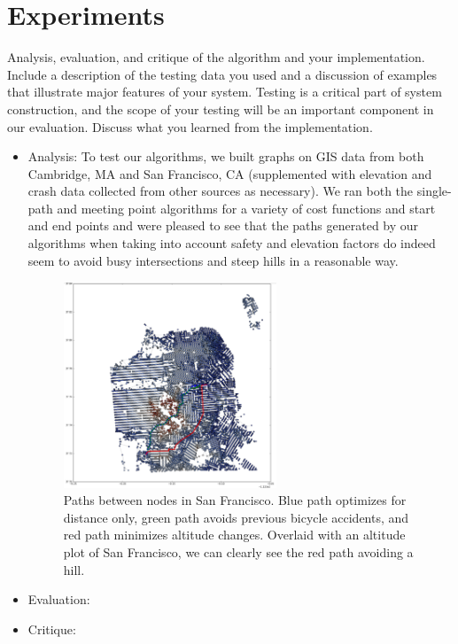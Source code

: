\documentclass[11pt]{article}
\begin{document}
\section{Experiments}
Analysis, evaluation, and critique of the algorithm and your
implementation. Include a description of the testing data you used and
a discussion of examples that illustrate major features of your
system. Testing is a critical part of system construction, and the
scope of your testing will be an important component in our
evaluation. Discuss what you learned from the implementation.
\begin{itemize}

\item{Analysis:} To test our algorithms, we built graphs on GIS data from both Cambridge, MA and San Francisco, CA (supplemented with elevation and crash data collected from other sources as necessary). We ran both the single-path and meeting point algorithms for a variety of cost functions and start and end points and were pleased to see that the paths generated by our algorithms when taking into account safety and elevation factors do indeed seem to avoid busy intersections and steep hills in a reasonable way.

\begin{figure}[H]
\caption{Paths between nodes in San Francisco. Blue path optimizes for distance only, green path avoids previous bicycle accidents, and red path minimizes altitude changes. Overlaid with an altitude plot of San Francisco, we can clearly see the red path avoiding a hill.}
\includegraphics[width=0.6\textwidth]{sf_new_plot_2.png}
\end{figure}

\item{Evaluation:}

\item{Critique:}

\end{itemize}
\end{document}
